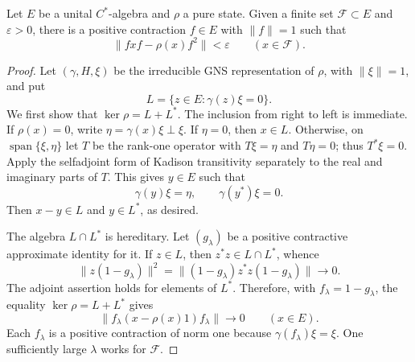 \begin{lemma}\label{lem:excision}
Let \(E\) be a unital \(C^*\)-algebra and \(\rho\) a pure state. Given a finite set \(\mathcal F\subset E\) and \(\varepsilon>0\), there is a positive contraction \(f\in E\) with \(\|f\|=1\) such that
\[
 \|fxf-\rho(x)f^2\|<\varepsilon\qquad(x\in\mathcal F).
\]
\end{lemma}
\begin{proof}
Let \((\gamma,H,\xi)\) be the irreducible GNS representation of \(\rho\), with \(\|\xi\|=1\), and put
\[
 L=\{z\in E:\gamma(z)\xi=0\}.
\]
We first show that \(\ker\rho=L+L^*\). The inclusion from right to left is immediate. If \(\rho(x)=0\), write \(\eta=\gamma(x)\xi\perp\xi\). If \(\eta=0\), then \(x\in L\). Otherwise, on \(\operatorname{span}\{\xi,\eta\}\) let \(T\) be the rank-one operator with \(T\xi=\eta\) and \(T\eta=0\); thus \(T^*\xi=0\). Apply the selfadjoint form of Kadison transitivity \cite[Theorem~1]{Kadison} separately to the real and imaginary parts of \(T\). This gives \(y\in E\) such that
\[
 \gamma(y)\xi=\eta,\qquad\gamma(y^*)\xi=0.
\]
Then \(x-y\in L\) and \(y\in L^*\), as desired.

The algebra \(L\cap L^*\) is hereditary. Let \((g_\lambda)\) be a positive contractive approximate identity for it. If \(z\in L\), then \(z^*z\in L\cap L^*\), whence
\[
 \|z(1-g_\lambda)\|^2
 =\|(1-g_\lambda)z^*z(1-g_\lambda)\|\longrightarrow0.
\]
The adjoint assertion holds for elements of \(L^*\). Therefore, with \(f_\lambda=1-g_\lambda\), the equality \(\ker\rho=L+L^*\) gives
\[
 \|f_\lambda(x-\rho(x)1)f_\lambda\|\longrightarrow0
 \qquad(x\in E).
\]
Each \(f_\lambda\) is a positive contraction of norm one because \(\gamma(f_\lambda)\xi=\xi\). One sufficiently large \(\lambda\) works for \(\mathcal F\).
\end{proof}

